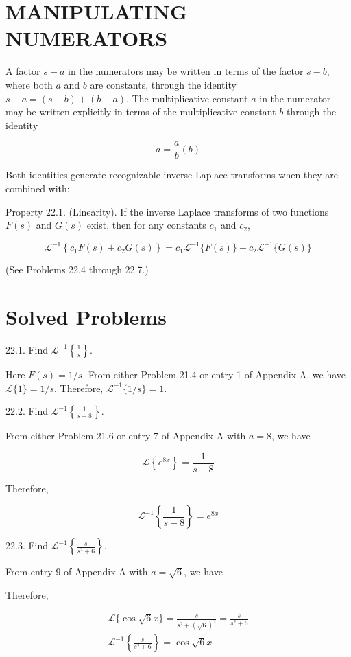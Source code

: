 \documentclass[10pt]{article}
\begin{document}
\section*{MANIPULATING NUMERATORS}
A factor $s-a$ in the numerators may be written in terms of the factor $s-b$, where both $a$ and $b$ are constants, through the identity $s-a=(s-b)+(b-a)$. The multiplicative constant $a$ in the numerator may be written explicitly in terms of the multiplicative constant $b$ through the identity

$$
a=\frac{a}{b}(b)
$$

Both identities generate recognizable inverse Laplace transforms when they are combined with:

Property 22.1. (Linearity). If the inverse Laplace transforms of two functions $F(s)$ and $G(s)$ exist, then for any constants $c_{1}$ and $c_{2}$,

$$
\mathscr{L}^{-1}\left\{c_{1} F(s)+c_{2} G(s)\right\}=c_{1} \mathscr{L}^{-1}\{F(s)\}+c_{2} \mathscr{L}^{-1}\{G(s)\}
$$

(See Problems 22.4 through 22.7.)

\section*{Solved Problems}
22.1. Find $\mathscr{L}^{-1}\left\{\frac{1}{s}\right\}$.

Here $F(s)=1 / s$. From either Problem 21.4 or entry 1 of Appendix A, we have $\mathscr{L}\{1\}=1 / s$. Therefore, $\mathscr{L}^{-1}\{1 / s\}=1$.

22.2. Find $\mathscr{L}^{-1}\left\{\frac{1}{s-8}\right\}$.

From either Problem 21.6 or entry 7 of Appendix A with $a=8$, we have

$$
\mathscr{L}\left\{e^{8 x}\right\}=\frac{1}{s-8}
$$

Therefore,

$$
\mathscr{L}^{-1}\left\{\frac{1}{s-8}\right\}=e^{8 x}
$$

22.3. Find $\mathscr{L}^{-1}\left\{\frac{s}{s^{2}+6}\right\}$.

From entry 9 of Appendix A with $a=\sqrt{6}$, we have

Therefore,

$$
\begin{gathered}
\mathscr{L}\{\cos \sqrt{6} x\}=\frac{s}{s^{2}+(\sqrt{6})^{2}}=\frac{s}{s^{2}+6} \\
\mathscr{L}^{-1}\left\{\frac{s}{s^{2}+6}\right\}=\cos \sqrt{6} x
\end{gathered}
$$
\end{document}
